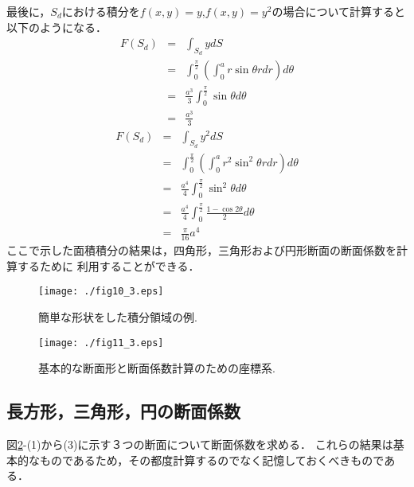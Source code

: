 \documentclass[10pt,a4j]{jarticle}
\begin{document}
最後に，$S_d$における積分を$f(x,y)=y$,$f(x,y)=y^2$の場合について計算すると
以下のようになる．
\begin{eqnarray}
	F(S_d) 
	&=& \int_{S_d} y dS \nonumber \\
	&=& \int_0^\frac{\pi}{2} \left( \int_0^a r\sin\theta rdr \right)d\theta \nonumber \\
	&=& \frac{a^3}{3}\int_0^\frac{\pi}{2} \sin\theta  d\theta \nonumber \\
	&=& \frac{a^3}{3}
	\label{eqn:int_Sd_y}
\end{eqnarray}
\begin{eqnarray}
	F(S_d) 
	&=& \int_{S_d} y^2 dS \nonumber \\
	&=& \int_0^\frac{\pi}{2} \left( \int_0^a r^2\sin^2\theta rdr \right)d\theta \nonumber \\
	&=& \frac{a^4}{4}\int_0^\frac{\pi}{2} \sin^2\theta d\theta \nonumber \\
	&=& \frac{a^4}{4} \int_0^\frac{\pi}{2} \frac{1-\cos 2\theta}{2} d\theta 
	\nonumber
	\\
	&=& \frac{\pi}{16}a^4
	\label{eqn:int_Sd_y2}
\end{eqnarray}
ここで示した面積積分の結果は，四角形，三角形および円形断面の断面係数を計算するために
利用することができる．
\begin{figure}[h]
	\begin{center}
	\texttt{[image: ./fig10\_3.eps]} 
	\end{center}
	\caption{
		簡単な形状をした積分領域の例. 
	} 
	\label{fig:fig10_3}
\end{figure}
\begin{figure}[h]
	\begin{center}
	\texttt{[image: ./fig11\_3.eps]} 
	\end{center}
	\caption{
		基本的な断面形と断面係数計算のための座標系.
	} 
	\label{fig:fig11_3}
\end{figure}
\subsection{長方形，三角形，円の断面係数}
図\ref{fig:fig11_3}-(1)から(3)に示す３つの断面について断面係数を求める．
これらの結果は基本的なものであるため，その都度計算するのでなく記憶しておくべきものである．
\end{document}
